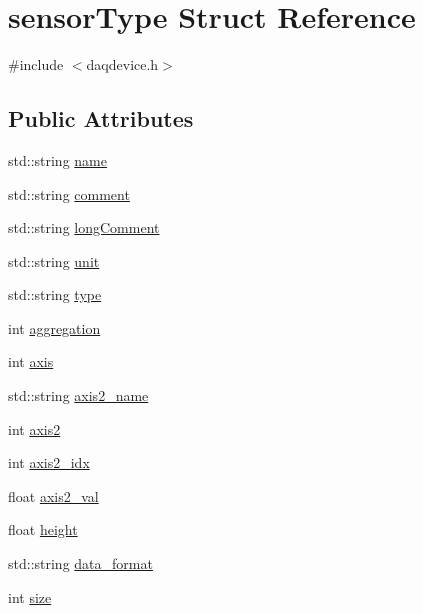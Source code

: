 \hypertarget{structsensorType}{\section{sensor\-Type Struct Reference}
\label{structsensorType}
}


{\ttfamily \#include $<$daqdevice.\-h$>$}

\subsection*{Public Attributes}
\begin{DoxyCompactItemize}
\item 
std\-::string \hyperlink{structsensorType_a839167cca6fe6ccd714bc106024ef05b}{name}
\item 
std\-::string \hyperlink{structsensorType_a81883599e96d5ad052203a3d46288187}{comment}
\item 
std\-::string \hyperlink{structsensorType_af7949131476e3d41809a66e56a19dd37}{long\-Comment}
\item 
std\-::string \hyperlink{structsensorType_aa79c2e4762be819e51b68fabed355c70}{unit}
\item 
std\-::string \hyperlink{structsensorType_a8e29e9b36a7bffe8ed80b4760266fa70}{type}
\item 
int \hyperlink{structsensorType_aaf364b2726c24b2f1e8555f12affe945}{aggregation}
\item 
int \hyperlink{structsensorType_af6bb097492d08aba292d4fd3fe26bc72}{axis}
\item 
std\-::string \hyperlink{structsensorType_a9c0494226b832c301af8a1a0a93b435a}{axis2\-\_\-name}
\item 
int \hyperlink{structsensorType_ae789d72cd0530bc886972463d6ff0ad5}{axis2}
\item 
int \hyperlink{structsensorType_a4beadcfed6e0266de2a8cfa21765e491}{axis2\-\_\-idx}
\item 
float \hyperlink{structsensorType_af861068c9850daaa347b0320daf38bc9}{axis2\-\_\-val}
\item 
float \hyperlink{structsensorType_a585db9c20888c66022c8493d2177e480}{height}
\item 
std\-::string \hyperlink{structsensorType_adabebb37268ffe2dfdba8517f6e9a87d}{data\-\_\-format}
\item 
int \hyperlink{structsensorType_ac4e84f68987ad6ce6d8b1b1736ed2f44}{size}
\end{DoxyCompactItemize}


